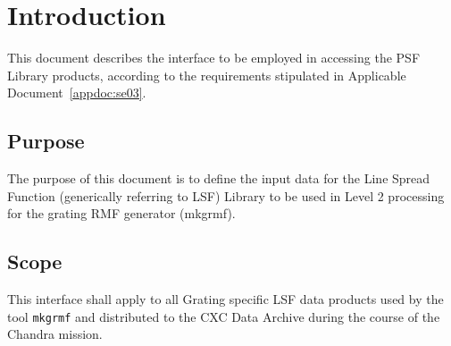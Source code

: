 \documentclass[twoside]{article}
\begin{document}
\tableofcontents
\clearpage


\section{Introduction}

This document describes the interface to be employed in accessing 
the PSF Library products, according to the requirements stipulated in 
Applicable Document~\ref{appdoc:se03}.%
%

\subsection{Purpose}

The purpose of this document is to define the input data for the Line
Spread Function (generically referring to LSF) Library to be used in
Level 2 processing for the grating RMF generator (mkgrmf).
%

\subsection{Scope}

This interface shall apply to all Grating specific LSF
data products used by the tool {\tt mkgrmf}
and distributed to the CXC Data
Archive during the course of
the Chandra mission.
\end{document}
